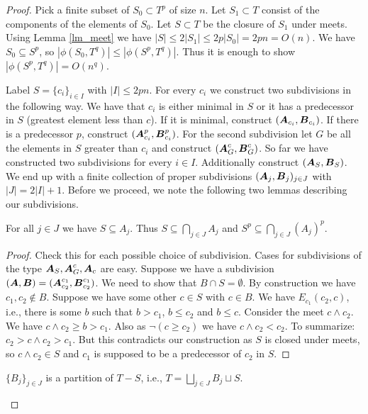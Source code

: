 \begin{proof}
  Pick a finite subset of $S_0 \subset T^p$ of size $n$. Let $S_1 \subset T$ consist of the components of the elements of $S_0$. Let $S \subset T$ be the closure of $S_1$ under meets. Using Lemma \ref{lm_meet} we have $|S| \leq 2|S_1| \leq 2p|S_0| = 2pn = O(n)$. We have $S_0 \subseteq S^p$, so $|\phi(S_0, T^q)| \leq |\phi(S^p, T^q)|$. Thus it is enough to show $|\phi(S^p, T^q)| = O(n^q)$.
  
  Label $S = \{c_i\}_{i \in I}$ with $|I| \leq 2pn$. For every $c_i$ we construct two subdivisions in the following way. We have that $c_i$ is either minimal in $S$ or it has a predecessor in $S$ (greatest element less than $c$). If it is minimal, construct $(\operatorname{\boldsymbol A}_{c_i}, \operatorname{\boldsymbol B}_{c_i})$. If there is a predecessor $p$, construct $(\operatorname{\boldsymbol A}^p_{c_i}, \operatorname{\boldsymbol B}^p_{c_i})$. For the second subdivision let $G$ be all the elements in $S$ greater than $c_i$ and construct $(\operatorname{\boldsymbol A}^c_G, \operatorname{\boldsymbol B}^c_G)$. So far we have constructed two subdivisions for every $i \in I$. Additionally construct $(\operatorname{\boldsymbol A}_S, \operatorname{\boldsymbol B}_S)$. We end up with a finite collection of proper subdivisions $(\operatorname{\boldsymbol A}_j, \operatorname{\boldsymbol B}_j)_{j \in J}$ with $|J| = 2|I| + 1$. Before we proceed, we note the following two lemmas describing our subdivisions.
  
  \begin{Lemma}
    For all $j \in J$ we have $S \subseteq A_j$. Thus $S \subseteq \bigcap_{j \in J} A_j$ and $S^p \subseteq \bigcap_{j \in J} (A_j)^p$. 
  \end{Lemma}
  
  \begin{proof}
    Check this for each possible choice of subdivision. Cases for subdivisions of the type $\operatorname{\boldsymbol A}_S, \operatorname{\boldsymbol A}^c_G, \operatorname{\boldsymbol A}_c$ are easy.
    Suppose we have a subdivision $(\operatorname{\boldsymbol A}, \operatorname{\boldsymbol B}) = (\operatorname{\boldsymbol A}^{c_1}_{c_2}, \operatorname{\boldsymbol B}^{c_1}_{c_2})$.
    We need to show that $B \cap S = \emptyset$.
    By construction we have $c_1, c_2 \notin B$.
    Suppose we have some other $c \in S$ with $c \in B$.
    We have $E_{c_1}(c_2, c)$, i.e., there is some $b$ such that $b > c_1$, $b \leq c_2$ and $b \leq c$.
    Consider the meet $c \wedge c_2$.
    We have $c \wedge c_2 \geq b > c_1$.
    Also as $\neg (c \geq c_2)$ we have $c \wedge c_2 < c_2$.
    To summarize: $c_2 > c \wedge c_2 > c_1$.
    But this contradicts our construction as $S$ is closed under meets,
    so $c \wedge c_2 \in S$ and $c_1$ is supposed to be a predecessor of $c_2$ in $S$.
  \end{proof}
  
  \begin{Lemma}
    $\{B_j\}_{j \in J}$ is a partition of $T - S$, i.e., $T = \bigsqcup_{j \in J} B_j \sqcup S$.
  \end{Lemma}
  

\end{proof}
